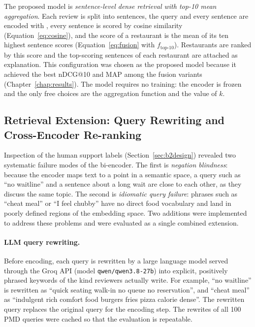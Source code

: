 The proposed model is \emph{sentence-level dense retrieval with top-10 mean aggregation}. Each review is split into sentences, the query and every sentence are encoded with \mpnet{}, every sentence is scored by cosine similarity (Equation~\ref{eq:cosine}), and the score of a restaurant is the mean of its ten highest sentence scores (Equation~\ref{eq:fusion} with $f_{\text{top-}10}$). Restaurants are ranked by this score and the top-scoring sentences of each restaurant are attached as explanation. This configuration was chosen as the proposed model because it achieved the best nDCG@10 and MAP among the fusion variants (Chapter~\ref{chap:results}). The model requires no training: the encoder is frozen and the only free choices are the aggregation function and the value of $k$.

\subsection{Retrieval Extension: Query Rewriting and Cross-Encoder Re-ranking}
\label{sec:b3}

Inspection of the human support labels (Section~\ref{sec:b2design}) revealed two systematic failure modes of the bi-encoder. The first is \emph{negation blindness}: because the encoder maps text to a point in a semantic space, a query such as ``no waitline'' and a sentence about a long wait are close to each other, as they discuss the same topic. The second is \emph{idiomatic query failure}: phrases such as ``cheat meal'' or ``I feel chubby'' have no direct food vocabulary and land in poorly defined regions of the embedding space. Two additions were implemented to address these problems and were evaluated as a single combined extension.

\paragraph{LLM query rewriting.} Before encoding, each query is rewritten by a large language model served through the Groq API (model \texttt{qwen/qwen3.8-27b}) into explicit, positively phrased keywords of the kind reviewers actually write. For example, ``no waitline'' is rewritten as ``quick seating walk-in no queue no reservation'', and ``cheat meal'' as ``indulgent rich comfort food burgers fries pizza calorie dense''. The rewritten query replaces the original query for the encoding step. The rewrites of all 100 PMD queries were cached so that the evaluation is repeatable.

